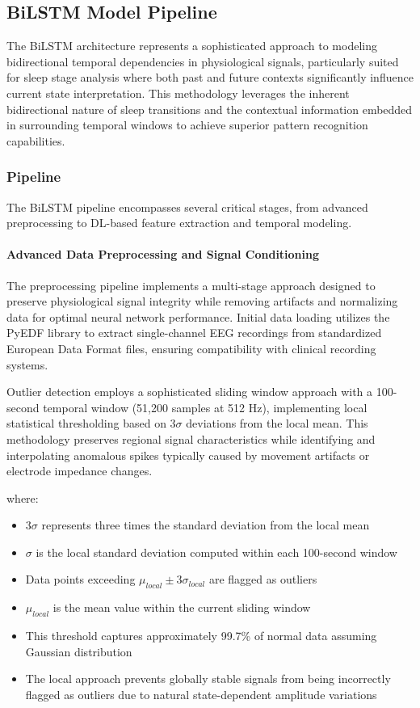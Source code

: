 \documentclass[a4paper,12pt,twoside]{article}
\begin{document}
\subsection{BiLSTM Model Pipeline}

The BiLSTM architecture represents a sophisticated approach to modeling bidirectional temporal dependencies in physiological signals, particularly suited for sleep stage analysis where both past and future contexts significantly influence current state interpretation. This methodology leverages the inherent bidirectional nature of sleep transitions and the contextual information embedded in surrounding temporal windows to achieve superior pattern recognition capabilities.

\subsubsection{Pipeline}

The BiLSTM pipeline encompasses several critical stages, from advanced preprocessing to DL-based feature extraction and temporal modeling.

\paragraph{Advanced Data Preprocessing and Signal Conditioning}

The preprocessing pipeline implements a multi-stage approach designed to preserve physiological signal integrity while removing artifacts and normalizing data for optimal neural network performance. Initial data loading utilizes the PyEDF library to extract single-channel EEG recordings from standardized European Data Format files, ensuring compatibility with clinical recording systems.

Outlier detection employs a sophisticated sliding window approach with a 100-second temporal window (51,200 samples at 512 Hz), implementing local statistical thresholding based on $3\sigma$ deviations from the local mean. This methodology preserves regional signal characteristics while identifying and interpolating anomalous spikes typically caused by movement artifacts or electrode impedance changes.

where:
\begin{itemize}
    \item $3\sigma$ represents three times the standard deviation from the local mean
    \item $\sigma$ is the local standard deviation computed within each 100-second window
    \item Data points exceeding $\mu_{local} \pm 3\sigma_{local}$ are flagged as outliers
    \item $\mu_{local}$ is the mean value within the current sliding window
    \item This threshold captures approximately 99.7\% of normal data assuming Gaussian distribution
    \item The local approach prevents globally stable signals from being incorrectly flagged as outliers due to natural state-dependent amplitude variations
\end{itemize}
\end{document}
